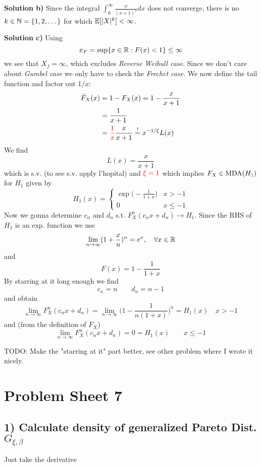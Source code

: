\textbf{Solution b)}
Since the integral $\int_0^\infty \frac{x}{(x+1)^2} dx$ does not converge, there is no $k\in\mathbb{N} = \{1,2,\dots\}$ for which $\mathbb{E}[|X|^k] < \infty$.

\textbf{Solution c)}
Using
\[
    x_F = \sup\{x\in\mathbb{R} : F(x) < 1\} \leq \infty
\]
we see that $X_f = \infty$, which excludes \textit{Reverse Weibull case}. Since we don't care about \textit{Gumbel case} we only have to check the \textit{Frechet case}.
We now define the tail function and factor out $1/x$:
\begin{align*}
    \bar{F}_X(x) &= 1 - F_X(x)  = 1 - \frac{x}{x+1} \\
                 &= \frac{1}{x+1} \\
                 &= \textcolor{red}{\frac{1}{x}}\frac{x}{x+1}
                  \overset{!}{=} x^{-1/\xi}L(x)
\end{align*}
We find
\[
    L(x) = \frac{x}{x+1}
\]
which is s.v. (to see s.v. apply l'hopital) and $\textcolor{red}{\xi = 1}$ which implies 
$F_X \in \text{MDA}(H_{\textcolor{red}{1}})$ for $H_1$ given by
\[
    H_1(x) =
    \begin{cases}
        \exp\big(-\frac{1}{1+x}\big) &x > -1 \\
        0 & x \leq -1
    \end{cases}
\]
Now we gonna determine $c_n$ and $d_n$ s.t. $F_X^n(c_n x + d_n) \to H_1$. Since the RHS of
$H_1$ is an exp. function we use
\[
    \lim_{n\to\infty}(1 + \frac{x}{n})^n = e^x, \quad
\forall x \in \mathbb{R}
\]
and
\[
    F(x) = 1 - \frac{1}{1+x}
\]
By starring at it long enough we find
\[
    c_n = n \qquad d_n = n - 1
\]
and obtain
\[
\lim_{n\to\infty} F_X^n(c_n x + d_n) = \lim_{n\to\infty}\big(1 -
\frac{1}{n(1+x)}\big)^n = H_1(x) \quad x > -1
\]
and (from the definition of $F_X$)
\[
    \lim_{n\to\infty} F_X^n(c_nx+d_n) = 0 = H_1(x) \qquad x \leq -1
\]

TODO: Make the "starring at it" part better, see other problem where I wrote it nicely.


%
%
\section*{Problem Sheet 7}
%
%
\subsection*{1) Calculate density of generalized Pareto Dist. $G_{\xi,\beta}$}
Just take the derivative

%
%
